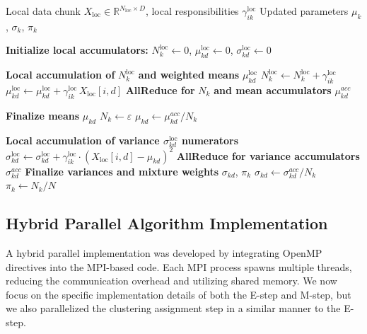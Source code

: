 \begin{algorithm}[H]
\caption{Parallel M-step}
\begin{algorithmic}[1]
\Require Local data chunk $X_{\text{loc}} \in \mathbb{R}^{N_{\text{loc}} \times D}$, local responsibilities $\gamma^{\text{loc}}_{ik}$
\Ensure Updated parameters $\mu_k$, $\sigma_k$, $\pi_k$

\State \textbf{Initialize local accumulators:}
\State $N^{\text{loc}}_k \gets 0$, \quad $\mu^{\text{loc}}_{kd} \gets 0$, \quad $\sigma^{\text{loc}}_{kd} \gets 0$

\Statex
\State \textbf{Local accumulation of} $N_k^{\text{loc}}$ \textbf{and weighted means} $\mu^{\text{loc}}_{kd}$
        \State $N^{\text{loc}}_k \gets N^{\text{loc}}_k + \gamma^{\text{loc}}_{ik}$
            \State $\mu^{\text{loc}}_{kd} \gets \mu^{\text{loc}}_{kd} + \gamma^{\text{loc}}_{ik}\, X_{\text{loc}}[i,d]$
        \EndFor
    \EndFor
\EndFor
\State \textbf{AllReduce for} $N_k$ \textbf{and mean accumulators} $\mu^{acc}_{kd}$

\Statex
\State \textbf{Finalize means} $\mu_{kd}$
     \State $N_k \gets \varepsilon$ \EndIf
        \State $\mu_{kd} \gets \mu^{acc}_{kd} / N_k$
    \EndFor
\EndFor

\Statex

\State \textbf{Local accumulation of variance  $\sigma^{\text{loc}}_{kd}$ numerators}
            \State $\sigma^{\text{loc}}_{kd} \gets \sigma^{\text{loc}}_{kd} 
             + \gamma^{\text{loc}}_{ik} \cdot (X_{\text{loc}}[i,d] - \mu_{kd})^2$
        \EndFor
    \EndFor
\EndFor
\State \textbf{AllReduce for variance accumulators} $\sigma^{acc}_{kd}$
\Statex
\State \textbf{Finalize variances and mixture weights} $\sigma_{kd}$, $\pi_k$
        \State $\sigma_{kd} \gets \sigma^{acc}_{kd} / N_k$
    \EndFor
    \State $\pi_k \gets N_k / N$
\EndFor

\end{algorithmic}
\label{parallel_m_step}
\end{algorithm}

\subsection{Hybrid Parallel Algorithm Implementation}
A hybrid parallel implementation was developed by integrating OpenMP directives into the MPI-based code. 
Each MPI process spawns multiple threads, reducing the communication overhead and utilizing shared memory.
We now focus on the specific implementation details of both the E-step and M-step, but we also parallelized the clustering assignment step in a similar manner to the E-step.


